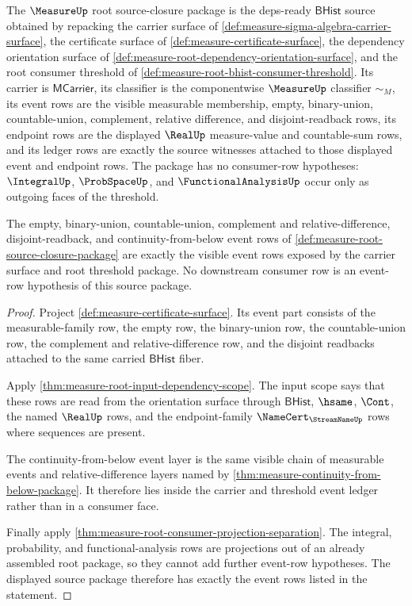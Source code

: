\begin{definition}
\label{def:measure-root-source-closure-package}
The $\MeasureUp$ root source-closure package is the deps-ready
$\mathsf{BHist}$ source obtained by repacking the carrier surface of
\autoref{def:measure-sigma-algebra-carrier-surface}, the certificate surface
of \autoref{def:measure-certificate-surface}, the dependency orientation
surface of \autoref{def:measure-root-dependency-orientation-surface}, and the
root consumer threshold of \autoref{def:measure-root-bhist-consumer-threshold}.
Its carrier is $\mathsf{MCarrier}$, its classifier is the componentwise
$\MeasureUp$ classifier $\sim_M$, its event rows are the visible measurable
membership, empty, binary-union, countable-union, complement, relative
difference, and disjoint-readback rows, its endpoint rows are the displayed
$\RealUp$ measure-value and countable-sum rows, and its ledger rows are exactly
the source witnesses attached to those displayed event and endpoint rows. The
package has no consumer-row hypotheses: $\IntegralUp$, $\ProbSpaceUp$, and
$\FunctionalAnalysisUp$ occur only as outgoing faces of the threshold.
\end{definition}

\begin{theorem}
\label{thm:measure-root-source-event-row-closure}
The empty, binary-union, countable-union, complement and
relative-difference, disjoint-readback, and continuity-from-below event rows
of \autoref{def:measure-root-source-closure-package} are exactly the visible
event rows exposed by the carrier surface and root threshold package. No
downstream consumer row is an event-row hypothesis of this source package.
\end{theorem}
\begin{proof}
Project \autoref{def:measure-certificate-surface}. Its event part consists of
the measurable-family row, the empty row, the binary-union row, the
countable-union row, the complement and relative-difference row, and the
disjoint readbacks attached to the same carried $\mathsf{BHist}$ fiber.

Apply \autoref{thm:measure-root-input-dependency-scope}. The input scope says
that these rows are read from the orientation surface through $\mathsf{BHist}$,
$\hsame$, $\Cont$, the named $\RealUp$ rows, and the endpoint-family
$\NameCert_{\StreamNameUp}$ rows where sequences are present.

The continuity-from-below event layer is the same visible chain of measurable
events and relative-difference layers named by
\autoref{thm:measure-continuity-from-below-package}. It therefore lies inside
the carrier and threshold event ledger rather than in a consumer face.

Finally apply \autoref{thm:measure-root-consumer-projection-separation}. The
integral, probability, and functional-analysis rows are projections out of an
already assembled root package, so they cannot add further event-row
hypotheses. The displayed source package therefore has exactly the event rows
listed in the statement.
\end{proof}

